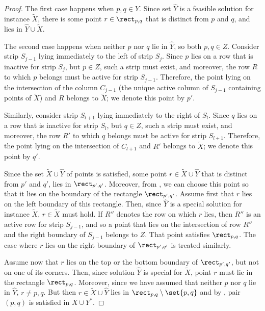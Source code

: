 \documentclass{toc}
\begin{document}
\begin{proof}
The first case happens when $p,q\in \hat Y$. Since set $\hat Y$ is a feasible solution for instance $\widetilde{X}$, there is some point $r\in \rect_{p,q}$ that is distinct from $p$ and $q$, and lies in $\hat Y\cup \widetilde{X}$. %
%


The second case happens when neither $p$ nor $q$ lie in $\hat Y$, so both $p,q\in Z$. Consider strip $S_{j-1}$ lying immediately to the left of strip $S_j$. Since $p$ lies on a row that is inactive for strip $S_j$, but $p\in Z$, such a strip must exist, and moreover, the row $R$ to which $p$ belongs must be active for strip $S_{j-1}$. Therefore, the point lying on the intersection of the column $C_{j-1}$ (the unique active column of $S_{j-1}$ containing points of $\widetilde{X}$) and $R$ belongs to $\widetilde{X}$; we denote this point by $p'$. 

Similarly, consider strip $S_{l+1}$ lying immediately to the right of $S_l$. Since $q$ lies on a row that is inactive for strip $S_l$, but $q\in Z$, such a strip must exist, and moreover, the row $R'$ to which $q$ belongs must be active for strip $S_{l+1}$. Therefore, the point lying on the intersection of $C_{l+1}$ and $R'$ belongs to $\widetilde{X}$; we denote this point by $q'$.

Since the set $\widetilde{X}\cup \hat Y$ of points is satisfied, some point $r\in \widetilde{X}\cup \hat Y$ that is distinct from $p'$ and $q'$, lies in $\rect_{p',q'}$. Moreover, from , we can choose this point so that it lies on the boundary of the rectangle $\rect_{p',q'}$. Assume first that $r$ lies on the left boundary of this rectangle. Then, since $\hat Y$ is a special solution for instance $\widetilde{X}$, $r\in \widetilde{X}$ must hold. If $R''$ denotes the row on which $r$ lies, then $R''$ is an active row for strip $S_{j-1}$, and so a point that lies on the intersection of row $R''$ and the right boundary of $S_{j-1}$ belongs to $Z$. That point satisfies $\rect_{p,q}$. The case where $r$ lies on the right boundary of $\rect_{p',q'}$ is treated similarly.

Assume now that $r$ lies on the top or the bottom boundary of $\rect_{p',q'}$, but not on one of its corners. Then, since solution $\hat Y$ is special for $\widetilde{X}$, point $r$ must lie in the rectangle $\rect_{p,q}$. Moreover, since we have assumed that neither $p$ nor $q$ lie in $\hat Y$, $r\neq p,q$. But then $r\in \widetilde{X}\cup \hat Y$ lies in $\rect_{p,q}\setminus\set{p,q}$ and by , pair $(p,q)$ is satisfied in $X\cup Y^*$.




\end{proof}
\end{document}
